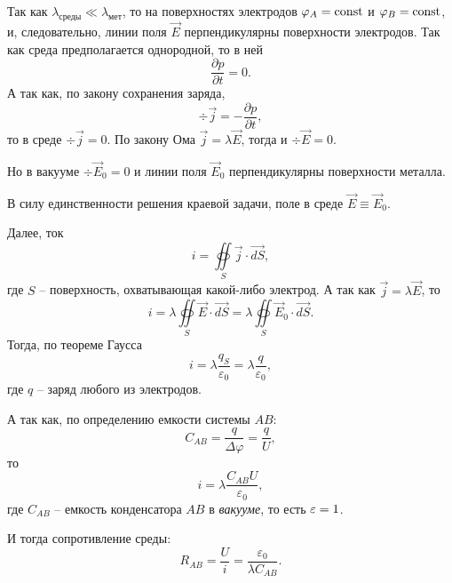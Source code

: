     \begin{solution}
        
        Так как \( \lambda_{\textit{среды}} \ll \lambda_{\textit{мет}} \), то на
        поверхностях электродов \( \varphi_A = \mathrm{const} \) и \( \varphi_B = \mathrm{const} \),
        и, следовательно, линии поля \( \vec{E} \) перпендикулярны поверхности
        электродов. Так как среда предполагается однородной, то в ней
        \[
            \frac{\partial p}{\partial t} = 0.
        \]
        А так как, по закону сохранения заряда,
        \[
            \div\vec{j} = -\frac{\partial p}{\partial t},
        \]
        то в среде \( \div\vec{j} = 0 \). По закону Ома \( \vec{j} =
        \lambda\vec{E} \), тогда и \( \div\vec{E} = 0 \).

        Но в вакууме \( \div\vec{E}_0 = 0 \) и линии поля \( \vec{E}_0 \)
        перпендикулярны поверхности металла.
        
        В силу единственности решения краевой задачи, поле в среде
        \( \vec{E} \equiv \vec{E}_0 \).
        
        Далее, ток
        \[
            i = \oiint\limits_S \vec{j}\cdot\vec{dS},
        \]
        где \( S \) -- поверхность, охватывающая какой-либо электрод.
        А так как \( \vec{j} = \lambda\vec{E} \), то
        \[
            i = \lambda\oiint\limits_S \vec{E}\cdot\vec{dS} =
            \lambda\oiint\limits_S \vec{E}_0 \cdot \vec{dS}.
        \]
        Тогда, по теореме Гаусса
        \[
            i = \lambda\frac{q_S}{\varepsilon_0} = \lambda\frac{q}{\varepsilon_0},
        \]
        где \( q \) -- заряд любого из электродов.
        
        А так как, по определению емкости системы \( AB \):
        \[
            C_{AB} = \frac{q}{\Delta\varphi} = \frac{q}{U},
        \]
        то
        \[
          i = \lambda\frac{C_{AB}U}{\varepsilon_0},
        \]
        где \( C_{AB} \) -- емкость конденсатора \( AB \) в \textit{вакууме}, то
        есть \( \varepsilon = 1 \).
        
        И тогда сопротивление среды:
        \begin{equation}
            R_{AB} = \frac{U}{i} = \frac{\varepsilon_0}{\lambda C_{AB}}.
            \label{eq6:n1}
        \end{equation}
    \end{solution}
    
